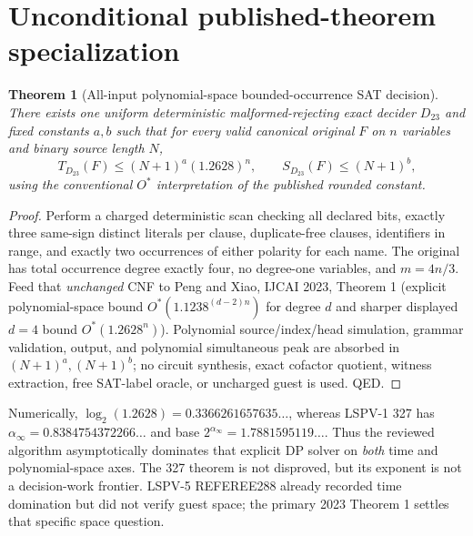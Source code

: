 \documentclass[11pt]{article}
\newtheorem{theorem}{Theorem}
\begin{document}
\section{Unconditional published-theorem specialization}
\begin{theorem}[All-input polynomial-space bounded-occurrence SAT decision]
There exists one uniform deterministic malformed-rejecting exact decider $D_{23}$ and fixed constants $a,b$ such that for every valid canonical original $F$ on $n$ variables and binary source length $N$,
\[
T_{D_{23}}(F)\le(N+1)^a(1.2628)^n,\qquad
S_{D_{23}}(F)\le(N+1)^b,
\]
using the conventional $O^*$ interpretation of the published rounded constant.
\end{theorem}
\begin{proof}
Perform a charged deterministic scan checking all declared bits, exactly three same-sign distinct literals per clause, duplicate-free clauses, identifiers in range, and exactly two occurrences of either polarity for each name. The original has total occurrence degree exactly four, no degree-one variables, and $m=4n/3$. Feed that \emph{unchanged} CNF to Peng and Xiao, IJCAI 2023, Theorem 1 (explicit polynomial-space bound $O^*(1.1238^{(d-2)n})$ for degree $d$ and sharper displayed $d=4$ bound $O^*(1.2628^n)$). Polynomial source/index/head simulation, grammar validation, output, and polynomial simultaneous peak are absorbed in $(N+1)^a,(N+1)^b$; no circuit synthesis, exact cofactor quotient, witness extraction, free SAT-label oracle, or uncharged guest is used. QED.
\end{proof}
Numerically, $\log_2(1.2628)=0.3366261657635\ldots$, whereas LSPV-1 327 has $\alpha_{\infty}=0.8384754372266\ldots$ and base $2^{\alpha_{\infty}}=1.7881595119\ldots$. Thus the reviewed algorithm asymptotically dominates that explicit DP solver on \emph{both} time and polynomial-space axes. The 327 theorem is not disproved, but its exponent is not a decision-work frontier. LSPV-5 REFEREE288 already recorded time domination but did not verify guest space; the primary 2023 Theorem 1 settles that specific space question.
\end{document}
